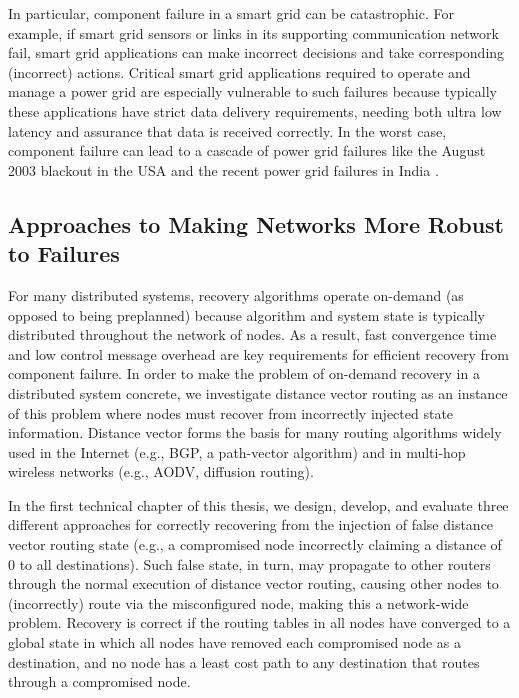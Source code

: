 In particular, component failure in a smart grid can be catastrophic.
For example, if smart grid sensors or links in its supporting communication network fail, smart grid applications can make incorrect decisions and take corresponding (incorrect) actions. 
Critical smart grid applications required to operate and manage a power grid are especially vulnerable to such failures because typically these applications have strict data delivery requirements,
needing both ultra low latency and assurance that data is received correctly. 
In the worst case, component failure can lead to a cascade of power grid failures like the August 2003 blackout in the USA \cite{2003Blackout} and the 
recent power grid failures in India \cite{IndiaBlackout}.






\subsection{Approaches to Making Networks More Robust to Failures}



For many distributed systems, recovery algorithms operate on-demand (as opposed to being preplanned) because algorithm and system state is typically distributed throughout the network of nodes.  
As a result, fast convergence time and low control message overhead are key requirements for efficient recovery from component failure. 
In order to make the problem of on-demand recovery in a distributed system concrete, we investigate distance vector routing as an instance of this problem where nodes must recover
from incorrectly injected state information.
Distance vector forms the basis for many routing algorithms widely used in the Internet (e.g., BGP, a path-vector algorithm) and in multi-hop wireless networks (e.g., AODV, diffusion routing).

In the first technical chapter of this thesis, we design, develop, and evaluate three different approaches for correctly recovering from the injection of false distance vector routing state (e.g., a compromised node incorrectly
claiming a distance of $0$ to all destinations). Such false state, in turn, may propagate to other routers through the normal execution of distance vector routing, causing other nodes to (incorrectly) route via the misconfigured node,
making this a network-wide problem. Recovery is correct if the routing tables in all nodes have converged to a global state in which all nodes have removed each compromised node as a destination,
and no node has a least cost path to any destination that routes through a compromised node.  

